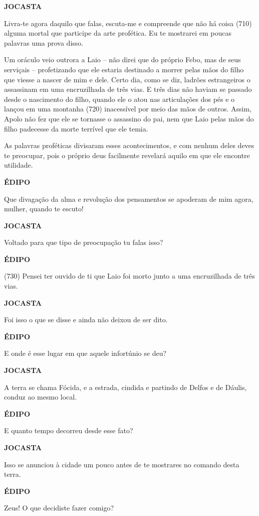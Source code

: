 \textbf{JOCASTA}

Livra-te agora daquilo que falas, escuta-me e compreende que não há
coisa (710) alguma mortal que participe da arte profética. Eu te
mostrarei em poucas palavras uma prova disso.

Um oráculo veio outrora a Laio -- não direi que do próprio Febo, mas de
seus serviçais -- profetizando que ele estaria destinado a morrer pelas
mãos do filho que viesse a nascer de mim e dele. Certo dia, como se diz,
ladrões estrangeiros o assassinam em uma encruzilhada de três vias. E
três dias não haviam se passado desde o nascimento do filho, quando ele
o atou nas articulações dos pés e o lançou em uma montanha (720)
inacessível por meio das mãos de outros. Assim, Apolo não fez que ele se
tornasse o assassino do pai, nem que Laio pelas mãos do filho padecesse
da morte terrível que ele temia.

As palavras proféticas divisaram esses acontecimentos, e com nenhum
deles deves te preocupar, pois o próprio deus facilmente revelará aquilo
em que ele encontre utilidade.

\textbf{ÉDIPO}

Que divagação da alma e revolução dos pensamentos se apoderam de mim
agora, mulher, quando te escuto!

\textbf{JOCASTA}

Voltado para que tipo de preocupação tu falas isso?

\textbf{ÉDIPO}

(730) Pensei ter ouvido de ti que Laio foi morto junto a uma
encruzilhada de três vias.

\textbf{JOCASTA}

Foi isso o que se disse e ainda não deixou de ser dito.

\textbf{ÉDIPO}

E onde é esse lugar em que aquele infortúnio se deu?

\textbf{JOCASTA}

A terra se chama Fócida, e a estrada, cindida e partindo de Delfos e de
Dáulis, conduz ao mesmo local.

\textbf{ÉDIPO}

E quanto tempo decorreu desde esse fato?

\textbf{JOCASTA}

Isso se anunciou à cidade um pouco antes de te mostrares no comando
desta terra.

\textbf{ÉDIPO}

Zeus! O que decidiste fazer comigo?

